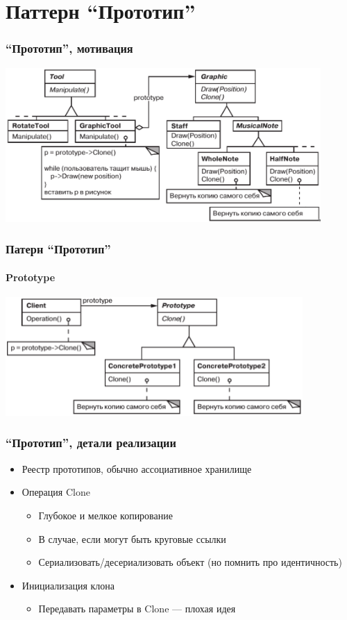 \documentclass[xetex,mathserif,serif]{beamer}
\begin{document}
    \section{Паттерн ``Прототип''}

    \begin{frame}
        \frametitle{``Прототип'', мотивация}
        \begin{center}
            \includegraphics[width=0.9\textwidth]{musicalEditor.png}
        \end{center}
    \end{frame}

    \begin{frame}
        \frametitle{Патерн ``Прототип''}
        \framesubtitle{Prototype}
        \begin{center}
            \includegraphics[width=0.85\textwidth]{prototype.png}
        \end{center}
    \end{frame}
    
    \begin{frame}
        \frametitle{``Прототип'', детали реализации}
        \begin{itemize}
            \item Реестр прототипов, обычно ассоциативное хранилище
            \item Операция Clone
            \begin{itemize}
                \item Глубокое и мелкое копирование
                \item В случае, если могут быть круговые ссылки
                \item Сериализовать/десериализовать объект (но помнить про идентичность)
            \end{itemize}
            \item Инициализация клона
            \begin{itemize}
                \item Передавать параметры в Clone --- плохая идея
            \end{itemize}
        \end{itemize}
    \end{frame}
\end{document}

